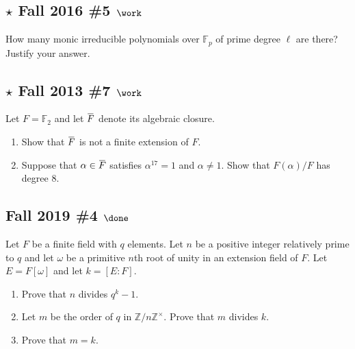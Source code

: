 \hypertarget{star-fall-2016-5-work}{%
\subsection{\texorpdfstring{\(\star\) Fall 2016 \#5
\(\work\)}{\textbackslash star Fall 2016 \#5 \textbackslash work}}\label{star-fall-2016-5-work}}

How many monic irreducible polynomials over \({\mathbb{F}}_p\) of prime
degree \(\ell\) are there? Justify your answer.

\hypertarget{star-fall-2013-7-work}{%
\subsection{\texorpdfstring{\(\star\) Fall 2013 \#7
\(\work\)}{\textbackslash star Fall 2013 \#7 \textbackslash work}}\label{star-fall-2013-7-work}}

Let \(F = {\mathbb{F}}_2\) and let
\(\mkern 1.5mu\overline{\mkern-1.5muF\mkern-1.5mu}\mkern 1.5mu\) denote
its algebraic closure.

\begin{enumerate}
\def\labelenumi{\alph{enumi}.}
\item
  Show that
  \(\mkern 1.5mu\overline{\mkern-1.5muF\mkern-1.5mu}\mkern 1.5mu\) is
  not a finite extension of \(F\).
\item
  Suppose that
  \(\alpha \in \mkern 1.5mu\overline{\mkern-1.5muF\mkern-1.5mu}\mkern 1.5mu\)
  satisfies \(\alpha^{17} = 1\) and \(\alpha\neq 1\). Show that
  \(F(\alpha)/F\) has degree 8.
\end{enumerate}

\hypertarget{fall-2019-4-done}{%
\subsection{\texorpdfstring{Fall 2019 \#4
\(\done\)}{Fall 2019 \#4 \textbackslash done}}\label{fall-2019-4-done}}

Let \(F\) be a finite field with \(q\) elements. Let \(n\) be a positive
integer relatively prime to \(q\) and let \(\omega\) be a primitive
\(n\)th root of unity in an extension field of \(F\). Let
\(E = F [\omega]\) and let \(k = [E : F]\).

\begin{enumerate}
\def\labelenumi{\alph{enumi}.}
\item
  Prove that \(n\) divides \(q^{k}-1\).
\item
  Let \(m\) be the order of \(q\) in
  \({\mathbb{Z}}/n{\mathbb{Z}}^{\times}\). Prove that \(m\) divides
  \(k\).
\item
  Prove that \(m = k\).
\end{enumerate}

